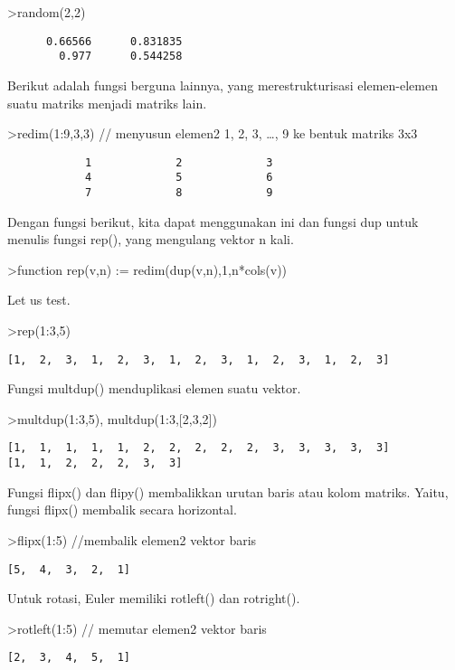 \documentclass[
]{book}
\begin{document}
\textgreater random(2,2)

\begin{verbatim}
      0.66566      0.831835 
        0.977      0.544258 
\end{verbatim}

Berikut adalah fungsi berguna lainnya, yang merestrukturisasi elemen-elemen suatu matriks menjadi matriks lain.

\textgreater redim(1:9,3,3) // menyusun elemen2 1, 2, 3, \ldots, 9 ke bentuk matriks 3x3

\begin{verbatim}
            1             2             3 
            4             5             6 
            7             8             9 
\end{verbatim}

Dengan fungsi berikut, kita dapat menggunakan ini dan fungsi dup untuk menulis fungsi rep(), yang mengulang vektor n kali.

\textgreater function rep(v,n) := redim(dup(v,n),1,n*cols(v))

Let us test.

\textgreater rep(1:3,5)

\begin{verbatim}
[1,  2,  3,  1,  2,  3,  1,  2,  3,  1,  2,  3,  1,  2,  3]
\end{verbatim}

Fungsi multdup() menduplikasi elemen suatu vektor.

\textgreater multdup(1:3,5), multdup(1:3,{[}2,3,2{]})

\begin{verbatim}
[1,  1,  1,  1,  1,  2,  2,  2,  2,  2,  3,  3,  3,  3,  3]
[1,  1,  2,  2,  2,  3,  3]
\end{verbatim}

Fungsi flipx() dan flipy() membalikkan urutan baris atau kolom matriks. Yaitu, fungsi flipx() membalik secara horizontal.

\textgreater flipx(1:5) //membalik elemen2 vektor baris

\begin{verbatim}
[5,  4,  3,  2,  1]
\end{verbatim}

Untuk rotasi, Euler memiliki rotleft() dan rotright().

\textgreater rotleft(1:5) // memutar elemen2 vektor baris

\begin{verbatim}
[2,  3,  4,  5,  1]
\end{verbatim}
\end{document}
